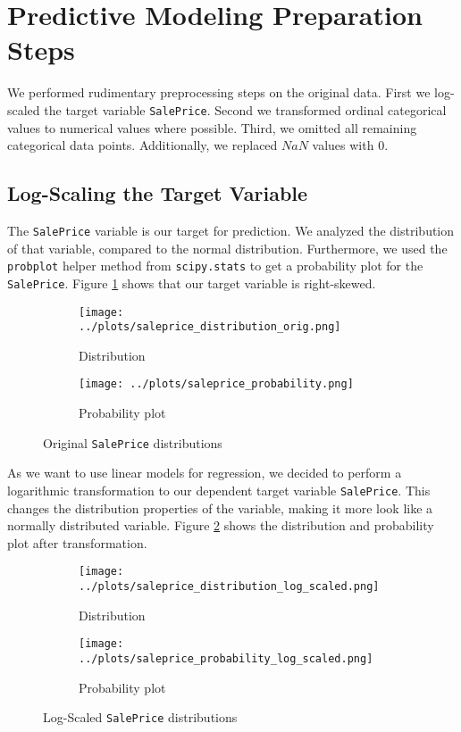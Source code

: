 \section{Predictive Modeling Preparation Steps}

We performed rudimentary preprocessing steps on the original data. First we log-scaled the target variable \texttt{SalePrice}. Second we transformed ordinal categorical values to numerical values where possible. Third, we omitted all remaining categorical data points. Additionally, we replaced $NaN$ values with $0$.

\subsection{Log-Scaling the Target Variable}
The \texttt{SalePrice} variable is our target for prediction. We analyzed the distribution of that variable, compared to the normal distribution. Furthermore, we used the \texttt{probplot} helper method from \texttt{scipy.stats} to get a probability plot for the \texttt{SalePrice}. Figure \ref{fig:saleprice_orig} shows that our target variable is right-skewed.

\begin{figure}
    \centering
    \begin{subfigure}{.4\textwidth}
        \texttt{[image: ../plots/saleprice\_distribution\_orig.png]}
        \caption{Distribution}
    \end{subfigure}
    \begin{subfigure}{.4\textwidth}
        \texttt{[image: ../plots/saleprice\_probability.png]}
        \caption{Probability plot}
    \end{subfigure}
    \caption{Original \texttt{SalePrice} distributions}
    \label{fig:saleprice_orig}
\end{figure}

As we want to use linear models for regression, we decided to perform a logarithmic transformation to our dependent target variable \texttt{SalePrice}. This changes the distribution properties of the variable, making it more look like a normally distributed variable. Figure \ref{fig:saleprice_transformed} shows the distribution and probability plot after transformation.

\begin{figure}
    \centering
    \begin{subfigure}{.4\textwidth}
        \texttt{[image: ../plots/saleprice\_distribution\_log\_scaled.png]}
        \caption{Distribution}
    \end{subfigure}
    \begin{subfigure}{.4\textwidth}
        \texttt{[image: ../plots/saleprice\_probability\_log\_scaled.png]}
        \caption{Probability plot}
    \end{subfigure}
    \caption{Log-Scaled \texttt{SalePrice} distributions}
    \label{fig:saleprice_transformed}
\end{figure}

